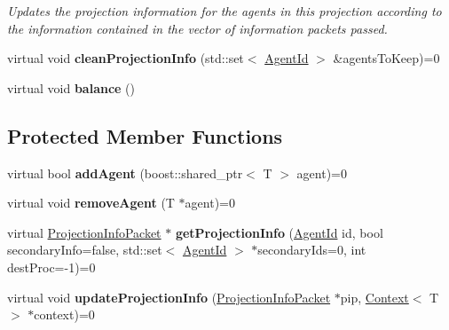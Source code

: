 \begin{DoxyCompactItemize}
\begin{DoxyCompactList}\small\item\em Updates the projection information for the agents in this projection according to the information contained in the vector of information packets passed. \end{DoxyCompactList}\item 
\hypertarget{classrepast_1_1_projection_a543d26d3a44b7f83ee363044ca6f4884}{virtual void {\bfseries clean\-Projection\-Info} (std\-::set$<$ \hyperlink{classrepast_1_1_agent_id}{Agent\-Id} $>$ \&agents\-To\-Keep)=0}\label{classrepast_1_1_projection_a543d26d3a44b7f83ee363044ca6f4884}

\item 
\hypertarget{classrepast_1_1_projection_afd5cda203753da3d565d7839f92589e8}{virtual void {\bfseries balance} ()}\label{classrepast_1_1_projection_afd5cda203753da3d565d7839f92589e8}

\end{DoxyCompactItemize}
\subsection*{Protected Member Functions}
\begin{DoxyCompactItemize}
\item 
\hypertarget{classrepast_1_1_projection_ac232dfc16ee5ccdb04d694abf79ce9a3}{virtual bool {\bfseries add\-Agent} (boost\-::shared\-\_\-ptr$<$ T $>$ agent)=0}\label{classrepast_1_1_projection_ac232dfc16ee5ccdb04d694abf79ce9a3}

\item 
\hypertarget{classrepast_1_1_projection_a804afdbcd384a23f7bf2c7a53209f272}{virtual void {\bfseries remove\-Agent} (T $\ast$agent)=0}\label{classrepast_1_1_projection_a804afdbcd384a23f7bf2c7a53209f272}

\item 
\hypertarget{classrepast_1_1_projection_af1e3b8e72e84bb73b6260b45cb2d20e5}{virtual \hyperlink{classrepast_1_1_projection_info_packet}{Projection\-Info\-Packet} $\ast$ {\bfseries get\-Projection\-Info} (\hyperlink{classrepast_1_1_agent_id}{Agent\-Id} id, bool secondary\-Info=false, std\-::set$<$ \hyperlink{classrepast_1_1_agent_id}{Agent\-Id} $>$ $\ast$secondary\-Ids=0, int dest\-Proc=-\/1)=0}\label{classrepast_1_1_projection_af1e3b8e72e84bb73b6260b45cb2d20e5}

\item 
\hypertarget{classrepast_1_1_projection_a20dfbb08e40a0425cbf56cb8864f27c4}{virtual void {\bfseries update\-Projection\-Info} (\hyperlink{classrepast_1_1_projection_info_packet}{Projection\-Info\-Packet} $\ast$pip, \hyperlink{classrepast_1_1_context}{Context}$<$ T $>$ $\ast$context)=0}\label{classrepast_1_1_projection_a20dfbb08e40a0425cbf56cb8864f27c4}

\end{DoxyCompactItemize}
